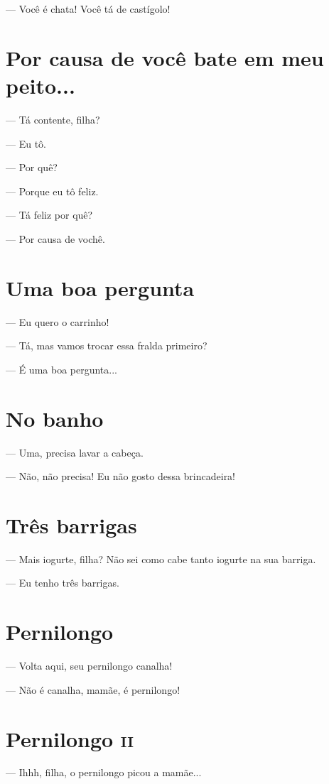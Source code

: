 — Você é chata! Você tá de castígolo!

\chapter{Por causa de você bate em meu peito...}

— Tá contente, filha?

— Eu tô.

— Por quê?

— Porque eu tô feliz.

— Tá feliz por quê?

— Por causa de vochê.

\chapter{Uma boa pergunta}

— Eu quero o carrinho!

— Tá, mas vamos trocar essa fralda primeiro?

— É uma boa pergunta...

\chapter{No banho}

— Uma, precisa lavar a cabeça.

— Não, não precisa! Eu não gosto dessa brincadeira!

\chapter{Três barrigas}

— Mais iogurte, filha? Não sei como cabe tanto iogurte na sua barriga.

— Eu tenho três barrigas.

\chapter{Pernilongo}

— Volta aqui, seu pernilongo canalha!

— Não é canalha, mamãe, é pernilongo!

\chapter{Pernilongo \textsc{ii}}

— Ihhh, filha, o pernilongo picou a mamãe...

